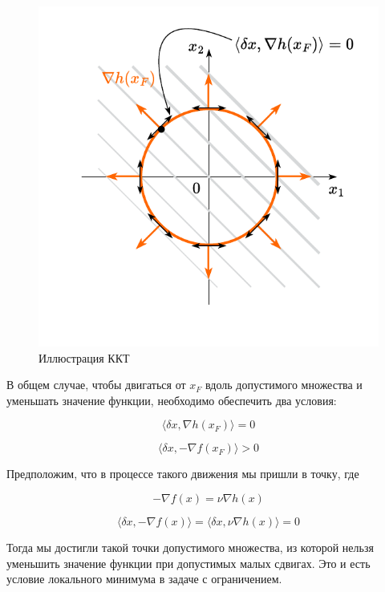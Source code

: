 \documentclass[
  russian,
  letterpaper,
  DIV=11,
  numbers=noendperiod]{scrartcl}
\begin{document}
\begin{figure}[H]

{\centering \includegraphics[width=0.5\linewidth,height=\textheight,keepaspectratio]{eq_constraint_9.pdf}

}

\caption{Иллюстрация ККТ}

\end{figure}%

В общем случае, чтобы двигаться от \(x_F\) вдоль допустимого множества и
уменьшать значение функции, необходимо обеспечить два условия:

\[
\langle \delta x, \nabla h(x_F) \rangle = 0
\]

\[
\langle \delta x, - \nabla f(x_F) \rangle > 0
\]

Предположим, что в процессе такого движения мы пришли в точку, где

\[
-\nabla f(x) = \nu \nabla h(x)
\]

\[
\langle  \delta x, - \nabla f(x)\rangle = \langle  \delta x, \nu\nabla h(x)\rangle = 0  
\]

Тогда мы достигли такой точки допустимого множества, из которой нельзя
уменьшить значение функции при допустимых малых сдвигах. Это и есть
условие локального минимума в задаче с ограничением.
\end{document}

